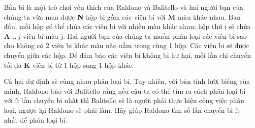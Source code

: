 Bắn bi là một trò chơi yêu thích của Raldono và Balitello và hai người bạn của chủng ta vừa mua được   \textbf{    N   }   hộp bi gồm các viên bi với   \textbf{    M   }   màu khác nhau. Ban đầu, mỗi hộp có thể chứa các viên bi với nhiều màu khác nhau; hộp thứ i sẽ chứa   \textbf{    A    $_     i, j    $}   viên bi màu j. Hai người bạn của chúng ta muốn phân loại các viên bi sao cho không có 2 viên bi khác màu nào nằm trong cùng 1 hộp. Các viên bi sẽ được chuyển giữa các hộp. Để đảm bảo các viên bi không bị hư hại, mỗi lần chỉ chuyển tối đa   \textbf{    K   }   viên bi từ 1 hộp sang 1 hộp khác.  

   Cả hai dự định sẽ cùng nhau phân loại bi. Tuy nhiên, với bản tính lười biếng của mình, Raldono bảo với Balitello rằng nếu cậu ta có thể tìm ra cách phân loại bi với ít lần chuyển bi nhất thì Balitello sẽ là người phải thực hiện công việc phân loại, ngược lại Raldono sẽ phải làm. Hãy giúp Raldono tìm số lần chuyển bi ít nhất để phân loại bi.